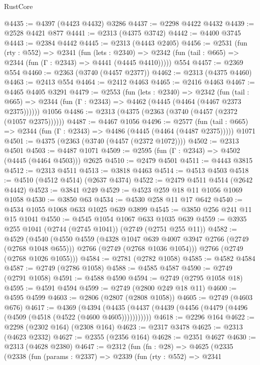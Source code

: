 \begin{lexlean}{RustCore}
\begin{coremodule}
@4435 := @4397 (@4423 @4432) @3286
@4437 := @2298 @4422 @4432
@4439 := @2528 @4421 @877
@4441 := @2313 (@4375 @3742)
@4442 := @4400 @3745
@4443 := @2384 @4442
@4445 := @2313 (@4443 @2405)
@4456 := @2531
    (fun (rty : @552) =>
    @2341
      (fun (lets : @2340) =>
      @2342 (fun (tail : @665) => @2344 (fun (Γ : @2343) => @4441 (@4445 @4410)))))
    @554
@4457 := @2369 @554
@4460 := @2363 (@3740 (@4457 @2377))
@4462 := @2313 (@4375 @4460)
@4463 := @2413 @554
@4464 := @2412 @4463
@4465 := @2416 @4463
@4467 := @4465 @4405 @3291
@4479 := @2553
    (fun (lets : @2340) =>
    @2342
      (fun (tail : @665) => @2344 (fun (Γ : @2343) => @4462 (@4445 (@4464 (@4467 @2373 @2375))))))
    @1056
@4486 := @2313 (@4375 (@2363 (@3740 (@4457 (@2372 (@1057 @2375))))))
@4487 := @4467 @1056
@4496 := @2577
    (fun (tail : @665) => @2344 (fun (Γ : @2343) => @4486 (@4445 (@4464 (@4487 @2375)))))
    @1071
@4501 := @4375 (@2363 (@3740 (@4457 (@2372 @1072))))
@4502 := @2313 @4501
@4503 := @4487 @1071
@4509 := @2595 (fun (Γ : @2343) => @4502 (@4445 (@4464 @4503))) @2625
@4510 := @2479 @4501
@4511 := @4443 @3815
@4512 := @2313 @4511
@4513 := @3818 @4463
@4514 := @4513 @4503
@4518 := @4510 (@4512 @4514) (@2637 @4374)
@4522 := @2479 @4511 @4514 (@2642 @4442)
@4523 := @3841 @249
@4529 := @4523 @259 @18 @11 @1056 @1069 @1058
@4530 := @3850 @63
@4534 := @4530 @258 @11 @17 @642
@4540 := @4534 @1055 @1068 @633 @1025 @639 @3899
@4545 := @3850 @256 @241 @11 @15 @1041
@4550 := @4545 @1054 @1067 @633 @1035 @639
@4559 := @3935 @255 @1041 (@2744 (@2745 @1041)) (@2749 (@2751 @255 @11))
@4582 := @4529
    (@4540
      (@4550
        @4559
        (@4328 @1047 @639 @4007 @3947 @2766 (@2749 (@2768 @1048 @655)))
        @2766
        (@2749 (@2768 @1036 @1054)))
      @2766
      (@2749 (@2768 @1026 @1055)))
@4584 := @2781 (@2782 @1058)
@4585 := @4582 @4584
@4587 := @2749 (@2786 @1058)
@4588 := @4585 @4587
@4590 := @2749 (@2791 @1058)
@4591 := @4588 @4590
@4594 := @2749 (@2795 @1058 @18)
@4595 := @4591 @4594
@4599 := @2749 (@2800 @249 @18 @11)
@4600 := @4595 @4599
@4603 := @2806 (@2807 (@2808 @1058))
@4605 := @2749 (@4603 @676)
@4617 := @4369
    (@4394 (@4435 (@4437 (@4439 (@4456 (@4479 (@4496 (@4509 (@4518 (@4522 (@4600 @4605)))))))))))
@4618 := @2296 @164
@4622 := @2298 (@2302 @164) (@2308 @164)
@4623 := @2317 @3478
@4625 := @2313 (@4623 @2332)
@4627 := @2355 (@2356 @164)
@4628 := @2351 @4627
@4630 := @2313 (@4628 @2380)
@4647 := @2312
    (fun (fn : @28) =>
    @4625
      (@2335
        (@2338
          (fun (params : @2337) =>
          @2339
            (fun (rty : @552) =>
            @2341

\end{coremodule}
\end{lexlean}

